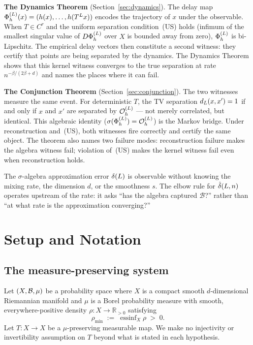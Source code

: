 \textbf{The Dynamics Theorem} (Section~\ref{sec:dynamics}).
The delay map $\Phi_h^{(L)}(x) = (h(x), \ldots, h(T^L x))$ encodes the
trajectory of $x$ under the observable.
When $T \in C^r$ and the uniform separation condition~(US)
holds (infimum of the smallest singular value of $D\Phi_h^{(L)}$ over $X$
is bounded away from zero), $\Phi_h^{(L)}$ is bi-Lipschitz.
The empirical delay vectors then constitute a second witness: they certify
that points are being separated by the dynamics.
The Dynamics Theorem shows that this kernel witness converges to the true
separation at rate $n^{-\beta/(2\beta+d)}$ and names the places where it can fail.

\textbf{The Conjunction Theorem} (Section~\ref{sec:conjunction}).
The two witnesses measure the same event.
For deterministic $T$, the TV separation $d_{L}(x,x') = 1$ if and
only if $x$ and $x'$ are separated by $\mathcal{O}_h^{(L)}$ --- not merely correlated, but
identical.
This algebraic identity ($\sigma(\Phi_h^{(L)}) = \mathcal{O}_h^{(L)}$) is the Markov bridge.
Under reconstruction and~(US), both witnesses fire correctly and certify the
same object.
The theorem also names two failure modes: reconstruction failure makes the
algebra witness fail; violation of~(US) makes the kernel witness fail even
when reconstruction holds.

The $\sigma$-algebra approximation error $\delta(L)$ is observable without
knowing the mixing rate, the dimension $d$, or the smoothness $s$.
The elbow rule for $\hat{\delta}(L,n)$ operates upstream of the rate: it asks
``has the algebra captured $\mathcal{B}$?'' rather than ``at what rate is
the approximation converging?''

\section{Setup and Notation}
\label{sec:setup}

\subsection{The measure-preserving system}

Let $(X, \mathcal{B}, \mu)$ be a probability space where $X$ is a compact smooth
$d$-dimensional Riemannian manifold and $\mu$ is a Borel probability measure
with smooth, everywhere-positive density $\rho : X \to \mathbb{R}_{>0}$
satisfying
\[
  \rho_{\min} \;:=\; \operatorname{essinf}_X \rho \;>\; 0.
\]
Let $T : X \to X$ be a $\mu$-preserving measurable map.
We make no injectivity or invertibility assumption on $T$ beyond what
is stated in each hypothesis.

